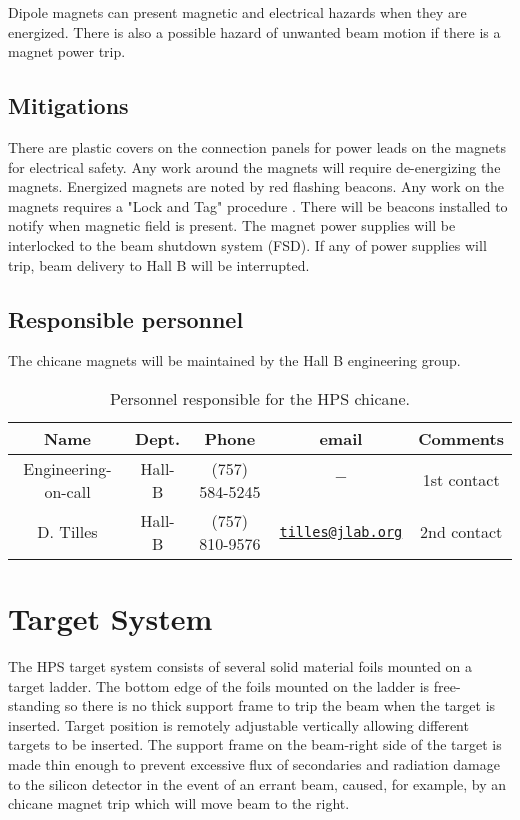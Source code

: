 \documentclass[11pt]{report}
\begin{document}
Dipole magnets can present magnetic and electrical hazards when they are energized. There is also a possible hazard of unwanted beam motion if there is a magnet power trip.  


\subsection{Mitigations}
\indent

There are plastic covers on the connection panels for power leads on the magnets for electrical safety. Any work around the magnets will require de-energizing the magnets. Energized magnets are noted by red flashing beacons. Any work on the magnets requires a "Lock and Tag" procedure \cite{ehs}. There will be beacons installed to notify when magnetic field is present. The magnet power supplies will be interlocked to the beam shutdown system (FSD). If any of power supplies will trip, beam delivery to Hall B will be interrupted.

\subsection{Responsible personnel}

The chicane magnets will be maintained by the Hall B engineering group.  

 \begin{table}[!ht]
 \centering
 \begin{tabular}{|c|c|c|c|c|}
\hline
 Name&Dept.&Phone&email&Comments \\ \hline
 Engineering-on-call & Hall-B&(757) 584-5245&$-$& 1st contact  \\ \hline
 D. Tilles & Hall-B&(757) 810-9576&\href{mailto:tilles@jlab.org}{\nolinkurl{tilles@jlab.org}}&2nd contact \\ \hline
  \end{tabular}
\caption{Personnel responsible for the HPS chicane.} 
\label{tb:magnets}
\end{table}


\section{Target System}

\indent

The HPS target system consists of several solid material foils mounted on a target ladder. The bottom edge of the foils mounted on the ladder is free-standing so there
is no thick support frame to trip the beam when the target is inserted. Target position is remotely  adjustable vertically allowing different targets to be inserted. The support
frame on the beam-right side of the target is made thin enough to
prevent excessive flux of secondaries and radiation damage to the silicon detector in the event of an errant
beam,  caused, for example, by an chicane magnet trip which will move beam to the right.
               
\end{document}
